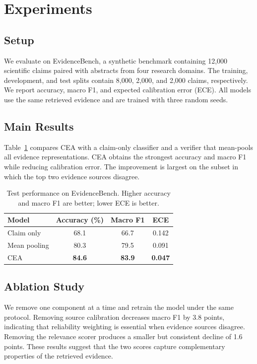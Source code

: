 \section{Experiments}

\subsection{Setup}

We evaluate on EvidenceBench, a synthetic benchmark containing 12,000 scientific
claims paired with abstracts from four research domains. The training, development, and
test splits contain 8,000, 2,000, and 2,000 claims, respectively. We report accuracy,
macro F1, and expected calibration error (ECE). All models use the same retrieved
evidence and are trained with three random seeds.

\subsection{Main Results}

Table~\ref{tab:main-results} compares CEA with a claim-only classifier and a verifier
that mean-pools all evidence representations. CEA obtains the strongest accuracy and
macro F1 while reducing calibration error. The improvement is largest on the subset in
which the top two evidence sources disagree.

\begin{table}[ht]
  \centering
  \caption{Test performance on EvidenceBench. Higher accuracy and macro F1 are better;
  lower ECE is better.}
  \label{tab:main-results}
  \begin{tabular}{lccc}
    \toprule
    Model & Accuracy (\%) & Macro F1 & ECE \\
    \midrule
    Claim only & 68.1 & 66.7 & 0.142 \\
    Mean pooling & 80.3 & 79.5 & 0.091 \\
    CEA & \textbf{84.6} & \textbf{83.9} & \textbf{0.047} \\
    \bottomrule
  \end{tabular}
\end{table}

\subsection{Ablation Study}

We remove one component at a time and retrain the model under the same protocol.
Removing source calibration decreases macro F1 by 3.8 points, indicating that
reliability weighting is essential when evidence sources disagree.
Removing the relevance scorer produces a smaller but consistent decline of 1.6 points.
These results suggest that the two scores capture complementary properties of the
retrieved evidence.
